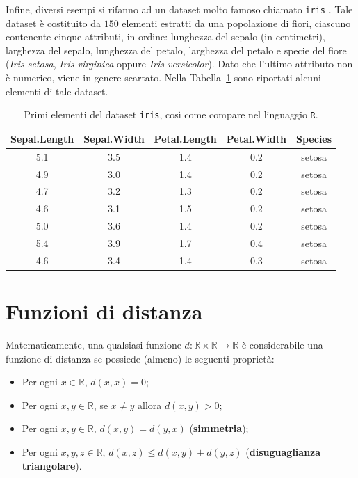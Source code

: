 \documentclass[a4paper, 12pt]{report}
\begin{document}
			Infine, diversi esempi si rifanno ad un dataset molto famoso
			chiamato \texttt{iris} \cite{https://doi.org/10.1111/j.1469-1809.1936.tb02137.x}.
			Tale dataset è costituito da $150$ elementi estratti da una
			popolazione di fiori, ciascuno contenente cinque attributi,
			in ordine: lunghezza del sepalo (in centimetri), larghezza
			del sepalo, lunghezza del petalo, larghezza del petalo e
			specie del fiore (\emph{Iris setosa}, \emph{Iris virginica}
			oppure \emph{Iris versicolor}). Dato che l'ultimo attributo
			non è numerico, viene in genere scartato. Nella
			Tabella~\ref{tab:iris-sample} sono riportati alcuni
			elementi di tale dataset.

			\begin{table}[H]
				\centering
				\begin{tabular}{c c c c c}
					\hline
					\textbf{Sepal.Length} &
					\textbf{Sepal.Width} &
					\textbf{Petal.Length} &
					\textbf{Petal.Width} &
					\textbf{Species} \\
					\hline
					5.1 & 3.5 & 1.4 & 0.2 & setosa \\
					4.9 & 3.0 & 1.4 & 0.2 & setosa \\
					4.7 & 3.2 & 1.3 & 0.2 & setosa \\
					4.6 & 3.1 & 1.5 & 0.2 & setosa \\
					5.0 & 3.6 & 1.4 & 0.2 & setosa \\
					5.4 & 3.9 & 1.7 & 0.4 & setosa \\
					4.6 & 3.4 & 1.4 & 0.3 & setosa \\
					\hline
				\end{tabular}
				\caption{Primi elementi del dataset \texttt{iris},
				così come compare nel linguaggio \texttt{R}.}
				\label{tab:iris-sample}
			\end{table}

		\section{Funzioni di distanza}

			Matematicamente, una qualsiasi funzione $d: \mathbb{R} \times
			\mathbb{R} \rightarrow \mathbb{R}$ è considerabile una funzione
			di distanza se possiede (almeno) le seguenti proprietà:

			\begin{itemize}
				\item
				Per ogni $x \in \mathbb{R}$, $d(x, x) = 0$;
				\item
				Per ogni $x, y \in \mathbb{R}$, se $x \neq y$ allora $d(x, y) > 0$;
				\item
				Per ogni $x, y \in \mathbb{R}$, $d(x, y) = d(y, x)$
				(\textbf{simmetria});
				\item
				Per ogni $x, y, z \in \mathbb{R}$, $d(x, z) \leq d(x, y) + d(y, z)$
				(\textbf{disuguaglianza triangolare}).
			\end{itemize}
\end{document}
